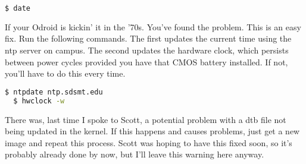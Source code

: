 \begin{lstlisting}[language=bash]
  $ date
\end{lstlisting}

If your Odroid is kickin' it in the '70s. You've found the problem. This is an easy fix. Run the following commands. The first updates the current time using the ntp server on campus. The second updates the hardware clock, which persists between power cycles provided you have that CMOS battery installed. If not, you'll have to do this every time.

\begin{lstlisting}[language=bash]
  $ ntpdate ntp.sdsmt.edu
  $	hwclock -w
\end{lstlisting}

There was, last time I spoke to Scott, a potential problem with a dtb file not being updated in the kernel. If this happens and causes problems, just get a new image and repeat this process. Scott was hoping to have this fixed soon, so it's probably already done by now, but I'll leave this warning here anyway.